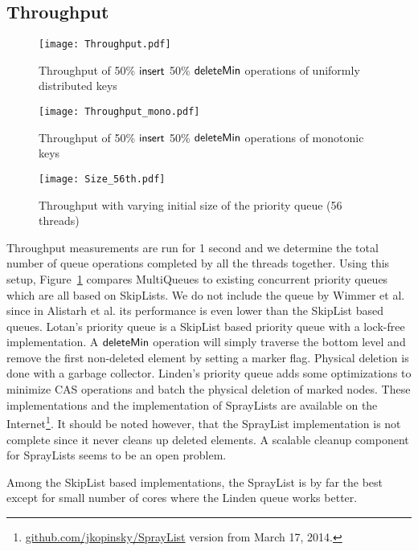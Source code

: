 \documentclass[a4paper,12pt]{article}
\newcommand{\Id}[1]{\ensuremath{\text{{\sf #1}}}}
\begin{document}
\subsection{Throughput}
\begin{figure}
\centering\texttt{[image: Throughput.pdf]}
\caption{Throughput of 50\% \Id{insert} 50\% \Id{deleteMin} operations of uniformly distributed keys} 
\label{fig:throughput}
\end{figure}


\begin{figure}
\centering\texttt{[image: Throughput\_mono.pdf]}
\caption{Throughput of 50\% \Id{insert} 50\% \Id{deleteMin} operations of monotonic keys}
\label{fig:mono}
\end{figure}

\begin{figure}
\centering\texttt{[image: Size\_56th.pdf]}
\caption{Throughput with varying initial size of the priority queue (56 threads)}
\label{fig:size}
\end{figure}


Throughput measurements are run for 1 second and we determine the total number of queue operations completed by all the threads together.
Using this setup, Figure~\ref{fig:throughput} compares
MultiQueues to existing concurrent priority queues which are all based on SkipLists. 
We do not include the queue by Wimmer et al. \cite{WVTCT14} since in Alistarh et al. \cite{AKLS14} its performance is even lower than the SkipList based queues.
Lotan's priority queue \cite{ShaLot00} is a SkipList based priority queue with a lock-free implementation. A \Id{deleteMin} operation will simply
traverse the bottom level and remove the first non-deleted element by setting a marker flag. Physical deletion is done
with a garbage collector. Linden's priority queue \cite{LinJon13} adds some optimizations to minimize CAS operations and
batch the physical deletion of marked nodes. 
These implementations and the implementation of SprayLists are available on the Internet\footnote{\url{github.com/jkopinsky/SprayList} version from March 17, 2014.}. It should be noted however, that the SprayList implementation is not complete since it never cleans up deleted elements. A scalable cleanup component for SprayLists seems to be an open problem.

Among the SkipList based implementations, the SprayList is by far the best except for small number of cores where the Linden queue works better. 
\end{document}
